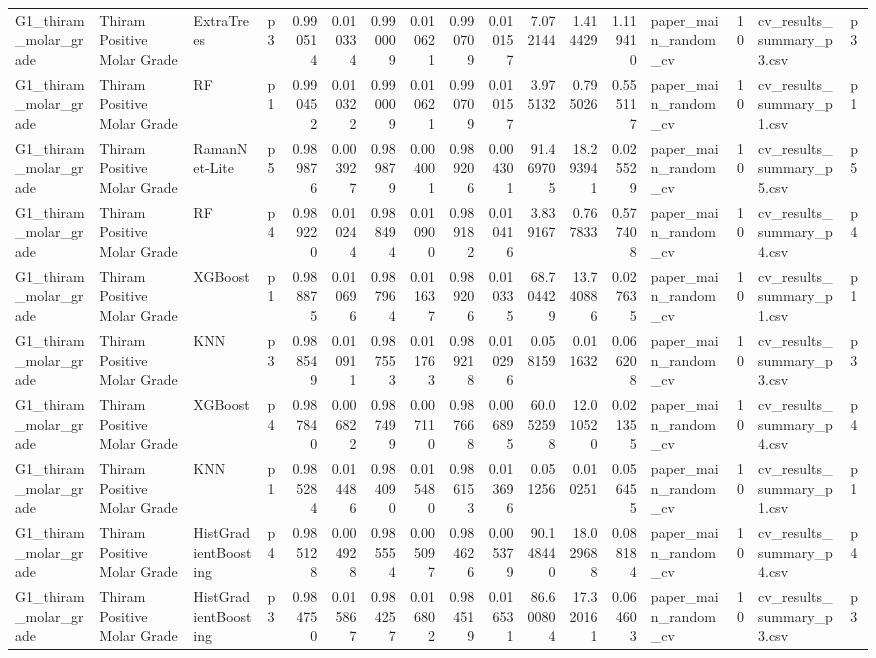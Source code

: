 \begin{tabular}{llllrrrrrrrrrlrll}
G1_thiram_molar_grade & Thiram Positive Molar Grade & ExtraTrees & p3 & 0.990514 & 0.010334 & 0.990009 & 0.010621 & 0.990709 & 0.010157 & 7.072144 & 1.414429 & 1.119410 & paper_main_random_cv & 10 & cv_results_summary_p3.csv & p3 \\
G1_thiram_molar_grade & Thiram Positive Molar Grade & RF & p1 & 0.990452 & 0.010322 & 0.990009 & 0.010621 & 0.990709 & 0.010157 & 3.975132 & 0.795026 & 0.555117 & paper_main_random_cv & 10 & cv_results_summary_p1.csv & p1 \\
G1_thiram_molar_grade & Thiram Positive Molar Grade & RamanNet-Lite & p5 & 0.989876 & 0.003927 & 0.989879 & 0.004001 & 0.989206 & 0.004301 & 91.469705 & 18.293941 & 0.025529 & paper_main_random_cv & 10 & cv_results_summary_p5.csv & p5 \\
G1_thiram_molar_grade & Thiram Positive Molar Grade & RF & p4 & 0.989220 & 0.010244 & 0.988494 & 0.010900 & 0.989182 & 0.010416 & 3.839167 & 0.767833 & 0.577408 & paper_main_random_cv & 10 & cv_results_summary_p4.csv & p4 \\
G1_thiram_molar_grade & Thiram Positive Molar Grade & XGBoost & p1 & 0.988875 & 0.010696 & 0.987964 & 0.011637 & 0.989206 & 0.010335 & 68.704429 & 13.740886 & 0.027635 & paper_main_random_cv & 10 & cv_results_summary_p1.csv & p1 \\
G1_thiram_molar_grade & Thiram Positive Molar Grade & KNN & p3 & 0.988549 & 0.010911 & 0.987553 & 0.011763 & 0.989218 & 0.010296 & 0.058159 & 0.011632 & 0.066208 & paper_main_random_cv & 10 & cv_results_summary_p3.csv & p3 \\
G1_thiram_molar_grade & Thiram Positive Molar Grade & XGBoost & p4 & 0.987840 & 0.006822 & 0.987499 & 0.007110 & 0.987668 & 0.006895 & 60.052598 & 12.010520 & 0.021355 & paper_main_random_cv & 10 & cv_results_summary_p4.csv & p4 \\
G1_thiram_molar_grade & Thiram Positive Molar Grade & KNN & p1 & 0.985284 & 0.014486 & 0.984090 & 0.015480 & 0.986153 & 0.013696 & 0.051256 & 0.010251 & 0.056455 & paper_main_random_cv & 10 & cv_results_summary_p1.csv & p1 \\
G1_thiram_molar_grade & Thiram Positive Molar Grade & HistGradientBoosting & p4 & 0.985128 & 0.004928 & 0.985554 & 0.005097 & 0.984626 & 0.005379 & 90.148440 & 18.029688 & 0.088184 & paper_main_random_cv & 10 & cv_results_summary_p4.csv & p4 \\
G1_thiram_molar_grade & Thiram Positive Molar Grade & HistGradientBoosting & p3 & 0.984750 & 0.015867 & 0.984257 & 0.016802 & 0.984519 & 0.016531 & 86.600804 & 17.320161 & 0.064603 & paper_main_random_cv & 10 & cv_results_summary_p3.csv & p3 \\

\end{tabular}
